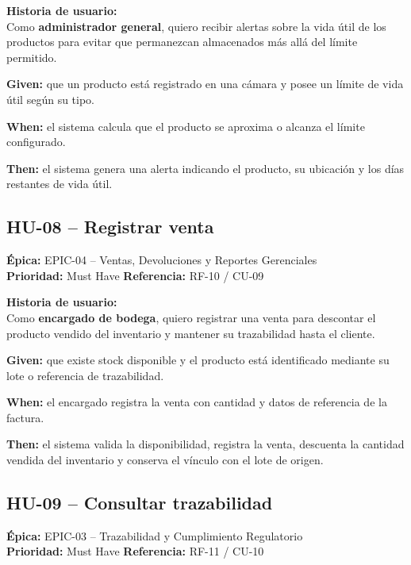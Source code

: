 \documentclass[11pt,a4paper]{article}
\begin{document}
\medskip
\textbf{Historia de usuario:}\\
Como \textbf{administrador general}, quiero recibir alertas sobre la vida útil de los productos
para evitar que permanezcan almacenados más allá del límite permitido.

\begin{tcolorbox}[colback=lightblue,colframe=uteqblue,title=\textbf{BDD -- Criterio de aceptación}]
\textbf{Given:} que un producto está registrado en una cámara y posee un límite de vida útil
según su tipo.

\medskip
\textbf{When:} el sistema calcula que el producto se aproxima o alcanza el límite configurado.

\medskip
\textbf{Then:} el sistema genera una alerta indicando el producto, su ubicación y los días
restantes de vida útil.
\end{tcolorbox}

\subsection{HU-08 -- Registrar venta}
\textbf{Épica:} EPIC-04 -- Ventas, Devoluciones y Reportes Gerenciales\\
\textbf{Prioridad:} Must Have \quad \textbf{Referencia:} RF-10 / CU-09

\medskip
\textbf{Historia de usuario:}\\
Como \textbf{encargado de bodega}, quiero registrar una venta para descontar el producto
vendido del inventario y mantener su trazabilidad hasta el cliente.

\begin{tcolorbox}[colback=lightblue,colframe=uteqblue,title=\textbf{BDD -- Criterio de aceptación}]
\textbf{Given:} que existe stock disponible y el producto está identificado mediante su lote
o referencia de trazabilidad.

\medskip
\textbf{When:} el encargado registra la venta con cantidad y datos de referencia de la factura.

\medskip
\textbf{Then:} el sistema valida la disponibilidad, registra la venta, descuenta la cantidad
vendida del inventario y conserva el vínculo con el lote de origen.
\end{tcolorbox}

\subsection{HU-09 -- Consultar trazabilidad}
\textbf{Épica:} EPIC-03 -- Trazabilidad y Cumplimiento Regulatorio\\
\textbf{Prioridad:} Must Have \quad \textbf{Referencia:} RF-11 / CU-10
\end{document}
